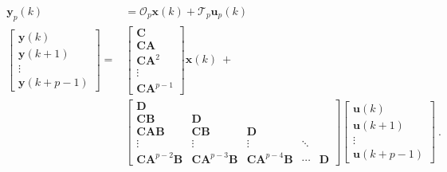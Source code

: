 \documentclass[letterpaper,10pt,english]{sphinxmanual}
\begin{document}
\begin{equation*}
\begin{split}\begin{aligned}
\bm{y}_{p}(k) &= \mathcal{O}_{p}\bm{x}(k) + \mathcal{T}_{p}\bm{u}_{p}(k) \\
\begin{bmatrix}
\bm{y}(k) \\
\bm{y}(k+1) \\
\vdots \\
\bm{y}(k+p-1)
\end{bmatrix}
=&
\begin{bmatrix}
\bm{C} \\
\bm{CA} \\
\bm{CA}^{2} \\
\vdots \\
\bm{CA}^{p-1}
\end{bmatrix}
\bm{x}(k)
~+ \\
&
\begin{bmatrix}
\bm{D} \\
\bm{CB} & \bm{D} \\
\bm{CAB} & \bm{CB} & \bm{D} \\
\vdots & \vdots & \vdots & \ddots \\
\bm{CA}^{p-2}\bm{B} & \bm{CA}^{p-3}\bm{B} & \bm{CA}^{p-4}\bm{B} & \cdots & \bm{D}
\end{bmatrix}
\begin{bmatrix}
\bm{u}(k) \\
\bm{u}(k+1) \\
\vdots \\
\bm{u}(k+p-1)
\end{bmatrix}~.
\end{aligned}\end{split}
\end{equation*}
\end{document}
